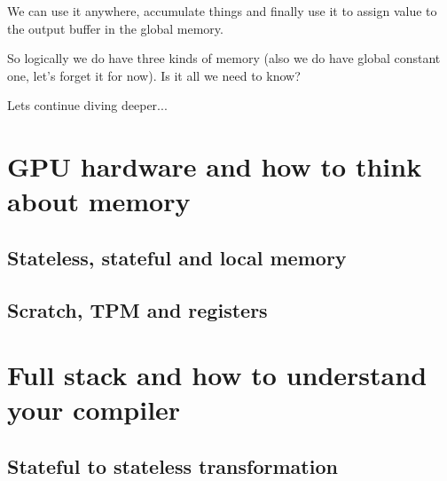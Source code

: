 \documentclass[a4paper,12pt,oneside]{article}
\begin{document}
We can use it anywhere, accumulate things and finally use it to assign value to the output buffer in the global memory.

So logically we do have three kinds of memory (also we do have global constant one, let's forget it for now). Is it all we need to know?

Lets continue diving deeper...

\section{GPU hardware and how to think about memory}\label{sec:GPUHW}


\subsection{Stateless, stateful and local memory}\label{subsec:StatelessFull}


\subsection{Scratch, TPM and registers}\label{subsec:ScratchTPM}


\section{Full stack and how to understand your compiler}\label{sec:Compiler}


\subsection{Stateful to stateless transformation}\label{subsec:ToStateless}

\end{document}
